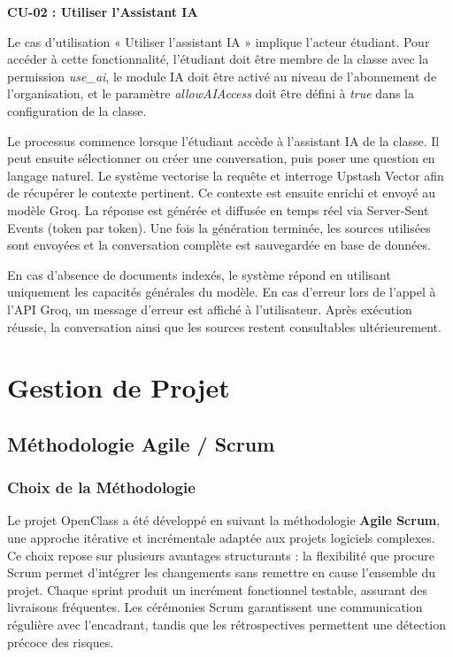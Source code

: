 \documentclass[12pt, a4paper, twoside]{report}
\begin{document}
\vspace{0.8em}

\textbf{CU-02 : Utiliser l'Assistant IA}

Le cas d'utilisation « Utiliser l'assistant IA » implique l'acteur étudiant. Pour accéder à cette fonctionnalité, l'étudiant doit être membre de la classe avec la permission \textit{use\_ai}, le module IA doit être activé au niveau de l'abonnement de l'organisation, et le paramètre \textit{allowAIAccess} doit être défini à \textit{true} dans la configuration de la classe.

Le processus commence lorsque l'étudiant accède à l'assistant IA de la classe. Il peut ensuite sélectionner ou créer une conversation, puis poser une question en langage naturel. Le système vectorise la requête et interroge Upstash Vector afin de récupérer le contexte pertinent. Ce contexte est ensuite enrichi et envoyé au modèle Groq. La réponse est générée et diffusée en temps réel via Server-Sent Events (token par token). Une fois la génération terminée, les sources utilisées sont envoyées et la conversation complète est sauvegardée en base de données.

En cas d'absence de documents indexés, le système répond en utilisant uniquement les capacités générales du modèle. En cas d'erreur lors de l'appel à l'API Groq, un message d'erreur est affiché à l'utilisateur. Après exécution réussie, la conversation ainsi que les sources restent consultables ultérieurement.

\chapter{Gestion de Projet}

\section{Méthodologie Agile / Scrum}

\subsection{Choix de la Méthodologie}

Le projet OpenClass a été développé en suivant la méthodologie \textbf{Agile
Scrum}, une approche itérative et incrémentale adaptée aux projets logiciels
complexes. Ce choix repose sur plusieurs avantages structurants : la flexibilité
que procure Scrum permet d'intégrer les changements sans remettre en cause
l'ensemble du projet. Chaque sprint produit un incrément fonctionnel testable,
assurant des livraisons fréquentes. Les cérémonies Scrum garantissent une
communication régulière avec l'encadrant, tandis que les rétrospectives permettent
une détection précoce des risques.
\end{document}
